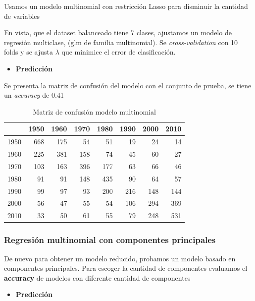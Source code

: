 \documentclass[conference,final,]{IEEEtran}
\providecommand{\tightlist}{%
  \setlength{\itemsep}{0pt}\setlength{\parskip}{0pt}}
\begin{document}
Usamos un modelo multinomial con restricción Lasso para disminuir la
cantidad de variables

En vista, que el dataset balanceado tiene 7 clases, ajustamos un modelo
de regresión multiclase, (glm de familia multinomial). Se
\emph{cross-validation} con 10 folds y se ajusta \(\lambda\) que
minimice el error de clasificación.

\begin{itemize}
\tightlist
\item
  \textbf{Predicción}
\end{itemize}

Se presenta la matriz de confusión del modelo con el conjunto de prueba,
se tiene un \emph{accuracy} de 0.41

\begin{table}[!t]
\centering
\caption{Matriz de confusión modelo multinomial} 
\begin{tabular}{r|rrrrrrr}
  \hline
 & 1950 & 1960 & 1970 & 1980 & 1990 & 2000 & 2010 \\ 
  \hline
1950 & 668 & 175 &  54 &  51 &  19 &  24 &  14 \\ 
  1960 & 225 & 381 & 158 &  74 &  45 &  60 &  27 \\ 
  1970 & 103 & 163 & 396 & 177 &  63 &  66 &  46 \\ 
  1980 &  91 &  91 & 148 & 435 &  90 &  64 &  57 \\ 
  1990 &  99 &  97 &  93 & 200 & 216 & 148 & 144 \\ 
  2000 &  56 &  47 &  55 &  54 & 106 & 294 & 369 \\ 
  2010 &  33 &  50 &  61 &  55 &  79 & 248 & 531 \\ 
   \hline
\end{tabular}
\end{table}

\hypertarget{regresion-multinomial-con-componentes-principales}{%
\subsubsection{Regresión multinomial con componentes
principales}\label{regresion-multinomial-con-componentes-principales}}

De nuevo para obtener un modelo reducido, probamos un modelo basado en
componentes principales. Para escoger la cantidad de componentes
evaluamos el \textbf{accuracy} de modelos con diferente cantidad de
componentes

\begin{itemize}
\tightlist
\item
  \textbf{Predicción}
\end{itemize}
\end{document}
